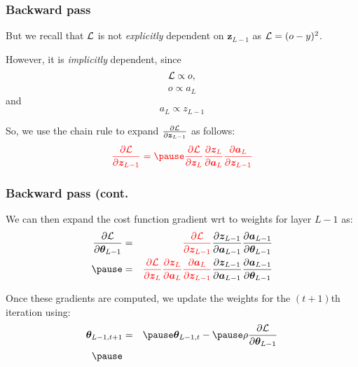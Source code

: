 \documentclass[smaller]{beamer}
\begin{document}
\begin{frame}
  \frametitle{Backward pass}
  \pause
  But we recall that $\mathcal{L}$ is not \textit{explicitly} dependent on $\bm z_{L-1}$ as $\mathcal L = (o - y)^{2}$.
  \pause

  However, it is \textit{implicitly} dependent, since\pause
  \begin{equation}
    \mathcal L \propto  o,
  \end{equation}
  \pause
  \begin{equation}
    o \propto a_{L}
  \end{equation}
  and\pause
  \begin{equation}
    a_{L} \propto z_{L-1}
  \end{equation}
  \pause
  
  So, we use the chain rule to expand $\frac{\partial{\mathcal{L}}}{\partial{\bm z_{L-1}}}$ as follows:\pause
  \begin{equation}\rd
    \pd{\mc{L}}{\bm z_{L-1}} = \pause \pd{\mc{L}}{\bm z_{L}}\pd{\bm z_{L}}{\bm a_{L}}\pd{\bm a_{L}}{\bm z_{L-1}}
  \end{equation}
\end{frame}

\begin{frame}
  \frametitle{Backward pass (cont.}
  \pause
  We can then expand the cost function gradient wrt to weights for layer $L-1$ as:\pause
  \begin{eqnarray}
    \pd{\mc{L}}{\bm \th_{L-1}} &=& {\rd \pd{\mc{L}}{\bm z_{L-1}}}\pd{\bm z_{L-1}}{\bm a_{L-1}}\pd{\bm a_{L-1}}{\bm\th_{L-1}}
                          \\\pause
                           &=& {\rd \pd{\mc{L}}{\bm z_{L}}\pd{\bm z_{L}}{\bm a_{L}}\pd{\bm a_{L}}{\bm z_{L-1}}}
    \pd{\bm z_{L-1}}{\bm a_{L-1}}\pd{\bm a_{L-1}}{\bm\th_{L-1}}
  \end{eqnarray}

  \pause

  Once these gradients are computed, we update the weights for the $(t+1)$th iteration using: \pause
   \begin{eqnarray}
    \bm\th_{L-1, t+1}  &=& \pause  \bm\th_{L-1,t} - \pause \rho \pd{\mc{L}}{\bm\th_{L-1}}  \\\pause
  \end{eqnarray}
\end{frame}
\end{document}
